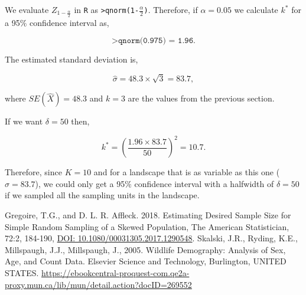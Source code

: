 \documentclass[11pt, oneside]{article}   	%
\begin{document}
We evaluate $Z_{1-\frac{\alpha}{2}}$ in \texttt{R} as \texttt{>qnorm(1-$\frac{\alpha}{2}$)}. Therefore, if $\alpha = 0.05$ we calculate $k^*$ for a 95$\%$ confidence interval as,

\[\texttt{>qnorm(0.975) = 1.96}. \]

The estimated standard deviation is,

\[\hat{\sigma} = 48.3 \times \sqrt{3} = 83.7,\]

where $SE(\hat{X}) = 48.3$ and $k = 3$ are the values from the previous section.

If we want $\delta = 50$ then,

\[k^* = \left(\frac{1.96 \times 83.7}{50} \right)^2 = 10.7.\]

Therefore, since $K=10$ and for a landscape that is as variable as this one ($\hat{\sigma} = 83.7$),  we could only get a 95$\%$ confidence interval with a halfwidth of $\delta = 50$ if we sampled all the sampling units in the landscape. 

\begin{thebibliography}{1}
 Gregoire, T.G., and D. L. R. Affleck. 2018. Estimating Desired Sample Size for Simple Random Sampling of a Skewed Population, The American Statistician, 72:2, 184-190, \url{DOI: 10.1080/00031305.2017.1290548}. 
 Skalski, J.R., Ryding, K.E., Millspaugh, J.J., Millspaugh, J., 2005. Wildlife Demography: Analysis of
Sex, Age, and Count Data. Elsevier Science and Technology, Burlington, UNITED STATES.
\url{https://ebookcentral-proquest-com.qe2a-proxy.mun.ca/lib/mun/detail.action?docID=269552}
\end{thebibliography}
\end{document}
